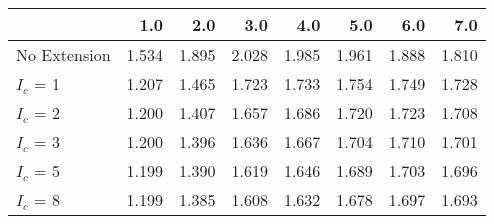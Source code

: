 \begin{tabular}{lrrrrrrr}
\toprule
{} &   1.0 &   2.0 &   3.0 &   4.0 &   5.0 &   6.0 &   7.0 \\
\midrule
No Extension & 1.534 & 1.895 & 2.028 & 1.985 & 1.961 & 1.888 & 1.810 \\
$I_c$ = 1    & 1.207 & 1.465 & 1.723 & 1.733 & 1.754 & 1.749 & 1.728 \\
$I_c$ = 2    & 1.200 & 1.407 & 1.657 & 1.686 & 1.720 & 1.723 & 1.708 \\
$I_c$ = 3    & 1.200 & 1.396 & 1.636 & 1.667 & 1.704 & 1.710 & 1.701 \\
$I_c$ = 5    & 1.199 & 1.390 & 1.619 & 1.646 & 1.689 & 1.703 & 1.696 \\
$I_c$ = 8    & 1.199 & 1.385 & 1.608 & 1.632 & 1.678 & 1.697 & 1.693 \\
\bottomrule
\end{tabular}
